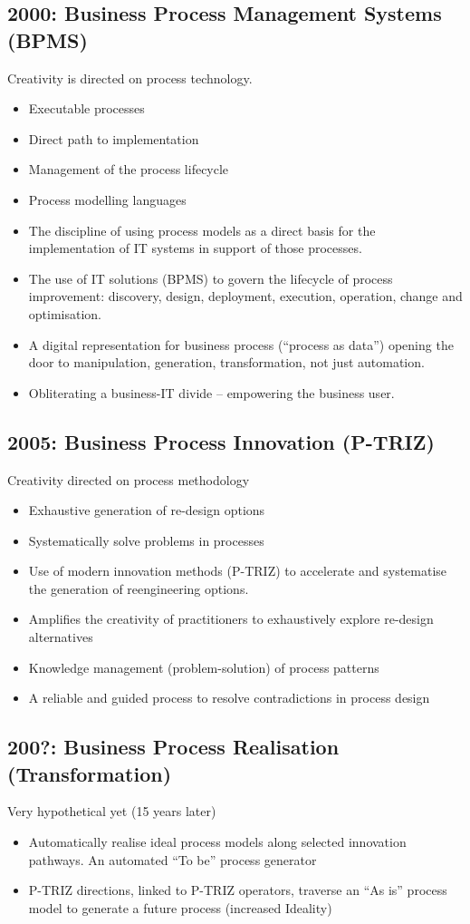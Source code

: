 \documentclass[11pt,a4paper]{article}
\begin{document}
\subsection{2000: Business Process Management Systems (BPMS)}
Creativity is directed on process technology. 
\begin{itemize}
\item Executable processes
\item Direct path to implementation
\item Management of the process lifecycle
\item Process modelling languages
\item The discipline of using process models as a direct basis for the
  implementation of IT systems in support of those processes.
\item The use of IT solutions (BPMS) to govern the lifecycle of process
  improvement: discovery, design, deployment, execution, operation, change and
  optimisation.
\item A digital representation for business process (“process as data”)
  opening the door to manipulation, generation, transformation, not just
  automation.
\item Obliterating a business-IT divide – empowering the business user. 
\end{itemize}

\subsection{2005: Business Process Innovation (P-TRIZ)}
Creativity directed on process methodology
\begin{itemize}
\item Exhaustive generation of re-design options
\item Systematically solve problems in processes
\item Use of modern innovation methods (P-TRIZ) to accelerate and systematise
  the generation of reengineering options.
\item Amplifies the creativity of practitioners to exhaustively explore
  re-design alternatives
\item Knowledge management (problem-solution) of process patterns
\item A reliable and guided process to resolve contradictions in process
  design
\end{itemize}

\subsection{200?: Business Process Realisation (Transformation)}
Very hypothetical yet (15 years later)
\begin{itemize}
\item Automatically realise ideal process models along selected innovation
  pathways. An automated “To be” process generator
\item P-TRIZ directions, linked to P-TRIZ operators, traverse an “As is”
  process model to generate a future process (increased Ideality)
\end{itemize}
\end{document}
